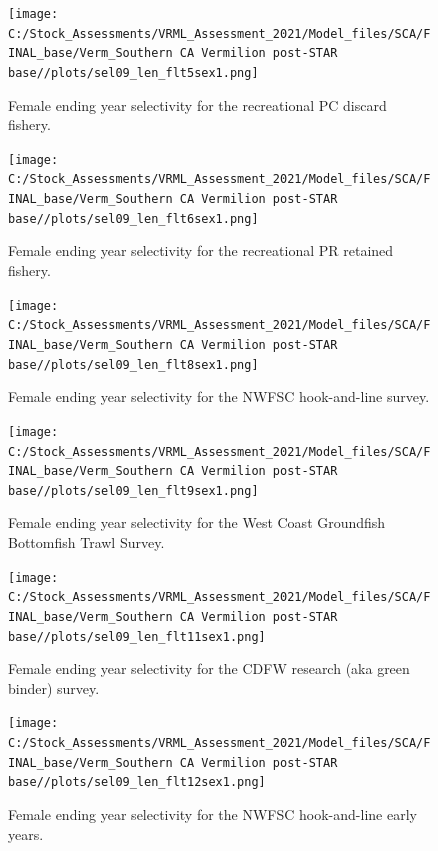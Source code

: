 \documentclass[11pt,
  english,
]{article}
\begin{document}
\begin{figure}
\centering
\texttt{[image: C:/Stock\_Assessments/VRML\_Assessment\_2021/Model\_files/SCA/FINAL\_base/Verm\_Southern CA Vermilion post-STAR base//plots/sel09\_len\_flt5sex1.png]}
\caption{Female ending year selectivity for the recreational PC discard fishery.\label{fig:endyr-selex-REC-PC-DIS}}
\end{figure}

\begin{figure}
\centering
\texttt{[image: C:/Stock\_Assessments/VRML\_Assessment\_2021/Model\_files/SCA/FINAL\_base/Verm\_Southern CA Vermilion post-STAR base//plots/sel09\_len\_flt6sex1.png]}
\caption{Female ending year selectivity for the recreational PR retained fishery.\label{fig:endyr-selex-REC-PR}}
\end{figure}

\begin{figure}
\centering
\texttt{[image: C:/Stock\_Assessments/VRML\_Assessment\_2021/Model\_files/SCA/FINAL\_base/Verm\_Southern CA Vermilion post-STAR base//plots/sel09\_len\_flt8sex1.png]}
\caption{Female ending year selectivity for the NWFSC hook-and-line survey.\label{fig:endyr-selex-NWFSC-HKL}}
\end{figure}

\begin{figure}
\centering
\texttt{[image: C:/Stock\_Assessments/VRML\_Assessment\_2021/Model\_files/SCA/FINAL\_base/Verm\_Southern CA Vermilion post-STAR base//plots/sel09\_len\_flt9sex1.png]}
\caption{Female ending year selectivity for the West Coast Groundfish Bottomfish Trawl Survey.\label{fig:endyr-selex-NWFSC-TWL}}
\end{figure}

\begin{figure}
\centering
\texttt{[image: C:/Stock\_Assessments/VRML\_Assessment\_2021/Model\_files/SCA/FINAL\_base/Verm\_Southern CA Vermilion post-STAR base//plots/sel09\_len\_flt11sex1.png]}
\caption{Female ending year selectivity for the CDFW research (aka green binder) survey.\label{fig:endyr-selex-CDFW-RESEARCH}}
\end{figure}

\begin{figure}
\centering
\texttt{[image: C:/Stock\_Assessments/VRML\_Assessment\_2021/Model\_files/SCA/FINAL\_base/Verm\_Southern CA Vermilion post-STAR base//plots/sel09\_len\_flt12sex1.png]}
\caption{Female ending year selectivity for the NWFSC hook-and-line early years.\label{fig:endyr-selex-EARLY-HKL}}
\end{figure}
\end{document}
